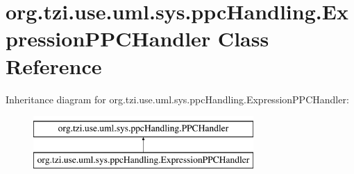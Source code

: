 \hypertarget{classorg_1_1tzi_1_1use_1_1uml_1_1sys_1_1ppc_handling_1_1_expression_p_p_c_handler}{\section{org.\-tzi.\-use.\-uml.\-sys.\-ppc\-Handling.\-Expression\-P\-P\-C\-Handler Class Reference}
\label{classorg_1_1tzi_1_1use_1_1uml_1_1sys_1_1ppc_handling_1_1_expression_p_p_c_handler}
}
Inheritance diagram for org.\-tzi.\-use.\-uml.\-sys.\-ppc\-Handling.\-Expression\-P\-P\-C\-Handler\-:\begin{figure}[H]
\begin{center}
\leavevmode
\includegraphics[height=2.000000cm]{classorg_1_1tzi_1_1use_1_1uml_1_1sys_1_1ppc_handling_1_1_expression_p_p_c_handler}
\end{center}
\end{figure}
